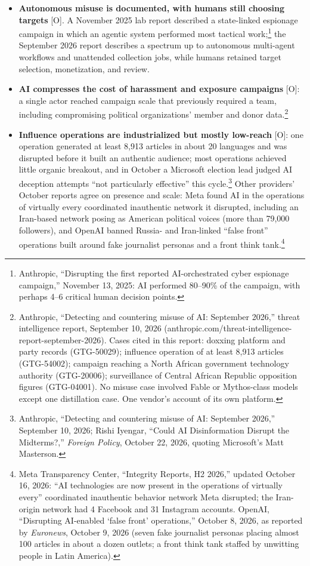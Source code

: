 \documentclass[11pt,letterpaper]{article}
\begin{document}
\begin{itemize}
  \item \textbf{Autonomous misuse is documented, with humans still choosing targets} [O]. A November 2025 lab report described a state-linked espionage campaign in which an agentic system performed most tactical work;\footnote{Anthropic, ``Disrupting the first reported AI-orchestrated cyber espionage campaign,'' November 13, 2025: AI performed 80--90\% of the campaign, with perhaps 4--6 critical human decision points.} the September 2026 report describes a spectrum up to autonomous multi-agent workflows and unattended collection jobs, while humans retained target selection, monetization, and review.
  \item \textbf{AI compresses the cost of harassment and exposure campaigns} [O]: a single actor reached campaign scale that previously required a team, including compromising political organizations' member and donor data.\footnote{Anthropic, ``Detecting and countering misuse of AI: September 2026,'' threat intelligence report, September 10, 2026 (anthropic.com/threat-intelligence-report-september-2026). Cases cited in this report: doxxing platform and party records (GTG-50029); influence operation of at least 8,913 articles (GTG-54002); campaign reaching a North African government technology authority (GTG-20006); surveillance of Central African Republic opposition figures (GTG-04001). No misuse case involved Fable or Mythos-class models except one distillation case. One vendor's account of its own platform.}
  \item \textbf{Influence operations are industrialized but mostly low-reach} [O]: one operation generated at least 8,913 articles in about 20 languages and was disrupted before it built an authentic audience; most operations achieved little organic breakout, and in October a Microsoft election lead judged AI deception attempts ``not particularly effective'' this cycle.\footnote{Anthropic, ``Detecting and countering misuse of AI: September 2026,'' September 10, 2026; Rishi Iyengar, ``Could AI Disinformation Disrupt the Midterms?,'' \textit{Foreign Policy}, October 22, 2026, quoting Microsoft's Matt Masterson.} Other providers' October reports agree on presence and scale: Meta found AI in the operations of virtually every coordinated inauthentic network it disrupted, including an Iran-based network posing as American political voices (more than 79,000 followers), and OpenAI banned Russia- and Iran-linked ``false front'' operations built around fake journalist personas and a front think tank.\footnote{Meta Transparency Center, ``Integrity Reports, H2 2026,'' updated October 16, 2026: ``AI technologies are now present in the operations of virtually every'' coordinated inauthentic behavior network Meta disrupted; the Iran-origin network had 4 Facebook and 31 Instagram accounts. OpenAI, ``Disrupting AI-enabled `false front' operations,'' October 8, 2026, as reported by \textit{Euronews}, October 9, 2026 (seven fake journalist personas placing almost 100 articles in about a dozen outlets; a front think tank staffed by unwitting people in Latin America).}

\end{itemize}
\end{document}
